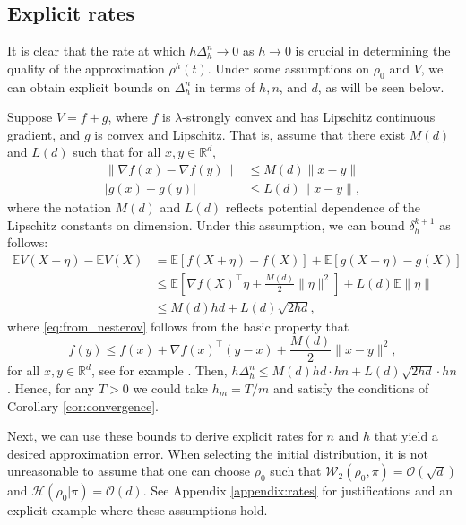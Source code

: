 \documentclass[final,12pt]{colt2018}
\newcommand{\was}{\mathcal{W}}
\begin{document}
\subsection{Explicit rates}\label{seq:explicit_rates}
It is clear that the rate at which $h\Delta_{h}^{n} \to 0$ as $h\to 0$ is crucial in determining the quality of the approximation $\rho^{h}(t)$. Under some assumptions on $\rho_0$ and $V$, we can obtain explicit bounds on $\Delta_{h}^{n}$ in terms of $h, n$, and $d$, as will be seen below.

Suppose $V = f + g$, where $f$ is $\lambda$-strongly convex and has Lipschitz continuous gradient, and $g$ is convex and Lipschitz. That is, assume that there exist $M(d)$ and $L(d)$ such that  for all $x,y \in \mathbb{R}^d$,
\begin{align} 
\|\nabla f(x) - \nabla f(y)\| &\leq M(d)\|x-y\| \label{eq:grad_f_lip}\\
|g(x) - g(y)| &\leq L(d)\|x-y\|, \label{eq:g_lip}
\end{align}
where the notation $M(d)$ and $L(d)$ reflects potential dependence of the Lipschitz constants on dimension. Under this assumption, we can bound  $\delta_{h}^{k+1}$ as follows:
\begin{align}
\mathbb{E}V(X+\eta) - \mathbb{E}V(X) &= \mathbb{E}[f(X+\eta) - f(X)] + \mathbb{E}[g(X+\eta) - g(X)]\\
&\leq \mathbb{E}\left[\nabla f(X)^\top \eta + \frac{M(d)}{2}\|\eta\|^2\right] +L(d) \mathbb{E}\|\eta\| \label{eq:from_nesterov}\\
&\leq M(d)hd + L(d)\sqrt{2hd},
\end{align}
where \eqref{eq:from_nesterov} follows from the basic property that
\begin{equation}
f(y) \leq f(x) +\nabla f(x)^\top(y-x) + \frac{M(d)}{2}\|x-y\|^2,
\end{equation}
for all $x,y \in \mathbb{R}^d$, see for example \citet{nesterov2013introductory}. Then, $h\Delta_{h}^n \leq M(d)hd \cdot hn + L(d)\sqrt{2hd}\cdot hn$. Hence, for any $T>0$ we could take $h_m = T/m$ and satisfy the conditions of Corollary \ref{cor:convergence}. 

Next, we can use these bounds to derive explicit rates for $n$ and $h$ that yield a desired approximation error. When selecting the initial distribution, it is not unreasonable to assume that one can choose $\rho_0$ such that $\was_2(\rho_0,\pi) = \mathcal{O}(\sqrt{d})$ and $\mathcal{H}(\rho_0 | \pi) =  \mathcal{O}(d)$. See Appendix \ref{appendix:rates} for justifications and an explicit example where these assumptions hold. 
\end{document}
